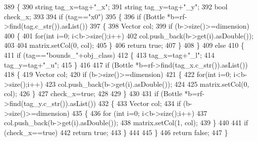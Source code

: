 \begin{DoxyCode}
389 \{
390    \textcolor{keywordtype}{string} tag\_x=tag+\textcolor{stringliteral}{"\_x"};
391    \textcolor{keywordtype}{string} tag\_y=tag+\textcolor{stringliteral}{"\_y"};
392    \textcolor{keywordtype}{bool} check\_x;
393 
394    \textcolor{keywordflow}{if} (tag==\textcolor{stringliteral}{"x0"})
395    \{
396        \textcolor{keywordflow}{if} (Bottle *b=rf->find(tag.c\_str()).asList())
397        \{
398            Vector col;
399            \textcolor{keywordflow}{if} (b->size()>=dimension)
400            \{
401                \textcolor{keywordflow}{for}(\textcolor{keywordtype}{int} i=0; i<b->size();i++)
402                    col.push\_back(b->get(i).asDouble());
403 
404                matrix.setCol(0, col);
405            \}
406            \textcolor{keywordflow}{return} \textcolor{keyword}{true};
407        \}
408    \}
409    \textcolor{keywordflow}{else}
410    \{
411        \textcolor{keywordflow}{if} (tag==\textcolor{stringliteral}{"bounds\_"}+obj_class)
412        \{
413            tag\_x=tag+\textcolor{stringliteral}{"\_l"};
414            tag\_y=tag+\textcolor{stringliteral}{"\_u"};
415        \}
416 
417        \textcolor{keywordflow}{if} (Bottle *b=rf->find(tag\_x.c\_str()).asList())
418        \{
419            Vector col;
420            \textcolor{keywordflow}{if} (b->size()>=dimension)
421            \{
422                \textcolor{keywordflow}{for}(\textcolor{keywordtype}{int} i=0; i<b->size();i++)
423                    col.push\_back(b->get(i).asDouble());
424 
425                matrix.setCol(0, col);
426            \}
427            check\_x=\textcolor{keyword}{true};
428 
429        \}
430 
431        \textcolor{keywordflow}{if} (Bottle *b=rf->find(tag\_y.c\_str()).asList())
432        \{
433            Vector col;
434            \textcolor{keywordflow}{if} (b->size()>=dimension)
435            \{
436                \textcolor{keywordflow}{for} (\textcolor{keywordtype}{int} i=0; i<b->size();i++)
437                    col.push\_back(b->get(i).asDouble());
438                matrix.setCol(1, col);
439            \}
440 
441            \textcolor{keywordflow}{if} (check\_x==\textcolor{keyword}{true})
442                \textcolor{keywordflow}{return} \textcolor{keyword}{true};
443        \}
444 
445    \}
446    \textcolor{keywordflow}{return} \textcolor{keyword}{false};
447 \}
\end{DoxyCode}
\mbox{\label{classSuperQuadric__NLP_a6895a29435328142fcb31a4827742fa6}} 
